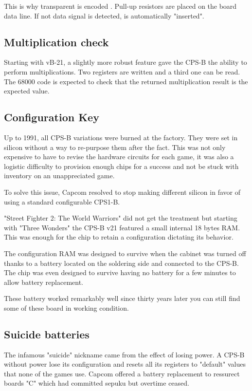\begin{trivia}
This is why transparent is encoded . Pull-up resistors are placed on the board data line. If not data signal is detected,  is automatically "inserted".
\end{trivia}

\subsection{Multiplication check}
Starting with vB-21, a slightly more robust feature gave the CPS-B the ability to perform multiplications. Two registers are written and a third one can be read. The 68000 code is expected to check that the returned multiplication result is the expected value.

\subsection{Configuration Key}
Up to 1991, all CPS-B variations were burned at the factory. They were set in silicon without a way to re-purpose them after the fact. This was not only expensive to have to revise the hardware circuits for each game, it was also a logistic difficulty to provision enough chips for a success and not be stuck with inventory on an unappreciated game.

To solve this issue, Capcom resolved to stop making different silicon in favor of using a standard configurable CPS1-B.

"Street Fighter 2: The World Warriors" did not get the treatment but starting with "Three Wonders" the CPS-B v21 featured a small internal 18 bytes RAM. This was enough for the chip to retain a configuration dictating its behavior\cite{petitSecurity}.

The configuration RAM was designed to survive when the cabinet was turned off thanks to a battery located  on the soldering side and connected to the CPS-B. The chip was even designed to survive having no battery for a few minutes to allow battery replacement.

\begin{trivia}
These battery worked remarkably well since thirty years later you can still find some of these board in working condition.
\end{trivia}

\subsection{Suicide batteries}
The infamous "suicide" nickname came from the effect of losing power. A CPS-B without power lose its configuration and resets all its registers to "default" values that none of the games use. Capcom offered a battery replacement to ressurect boards "C" which had committed sepuku but overtime ceased. 

